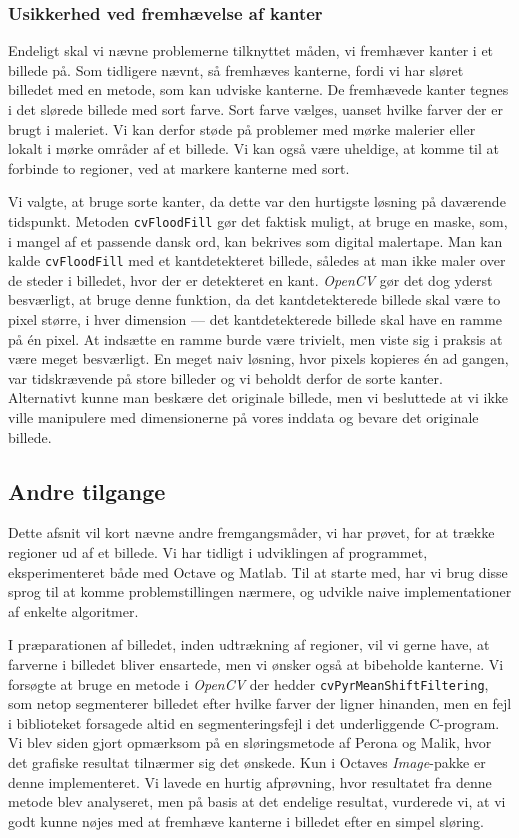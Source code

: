 {\subsubsection{Usikkerhed ved fremhævelse af kanter}
Endeligt skal vi nævne problemerne tilknyttet måden, vi fremhæver kanter
i et billede på. Som tidligere nævnt, så fremhæves kanterne, fordi vi
har sløret billedet med en metode, som kan udviske kanterne. De
fremhævede kanter tegnes i det slørede billede med sort farve.  Sort
farve vælges, uanset hvilke farver der er brugt i maleriet. Vi kan
derfor støde på problemer med mørke malerier eller lokalt i mørke
områder af et billede. Vi kan også være uheldige, at komme til at
forbinde to regioner, ved at markere kanterne med sort.

Vi valgte, at bruge sorte kanter, da dette var den hurtigste løsning på
daværende tidspunkt. Metoden \texttt{cvFloodFill} gør det faktisk
muligt, at bruge en maske, som, i mangel af et passende dansk ord, kan
bekrives som digital malertape. Man kan kalde \texttt{cvFloodFill} med
et kantdetekteret billede, således at man ikke maler over de steder i
billedet, hvor der er detekteret en kant. \emph{OpenCV} gør det dog
yderst besværligt, at bruge denne funktion, da det kantdetekterede
billede skal være to pixel større, i hver dimension --- det
kantdetekterede billede skal have en ramme på én pixel. At indsætte en
ramme burde være trivielt, men viste sig i praksis at være meget
besværligt. En meget naiv løsning, hvor pixels kopieres én ad gangen,
var tidskrævende på store billeder og vi beholdt derfor de sorte kanter.
Alternativt kunne man beskære det originale billede, men vi besluttede
at vi ikke ville manipulere med dimensionerne på vores inddata og bevare
det originale billede.

\subsection{Andre tilgange}
Dette afsnit vil kort nævne andre fremgangsmåder, vi har prøvet, for at
trække regioner ud af et billede. Vi har tidligt i udviklingen af
programmet, eksperimenteret både med Octave og Matlab. Til at starte
med, har vi brug disse sprog til at komme problemstillingen nærmere,
og udvikle naive implementationer af enkelte algoritmer.

I præparationen af billedet, inden udtrækning af regioner, vil vi gerne
have, at farverne i billedet bliver ensartede, men vi ønsker også at
bibeholde kanterne. Vi forsøgte at bruge en metode i \emph{OpenCV} der
hedder \texttt{cvPyrMeanShiftFiltering}, som netop segmenterer billedet
efter hvilke farver der ligner hinanden, men en fejl i biblioteket
forsagede altid en segmenteringsfejl i det underliggende C-program. Vi
blev siden gjort opmærksom på en sløringsmetode af Perona og
Malik\cite{perona1990scale}, hvor det grafiske resultat tilnærmer sig
det ønskede. Kun i Octaves \emph{Image}-pakke er denne implementeret. Vi
lavede en hurtig afprøvning, hvor resultatet fra denne metode blev
analyseret, men på basis at det endelige resultat, vurderede vi, at vi
godt kunne nøjes med at fremhæve kanterne i billedet efter en simpel
sløring.

}
